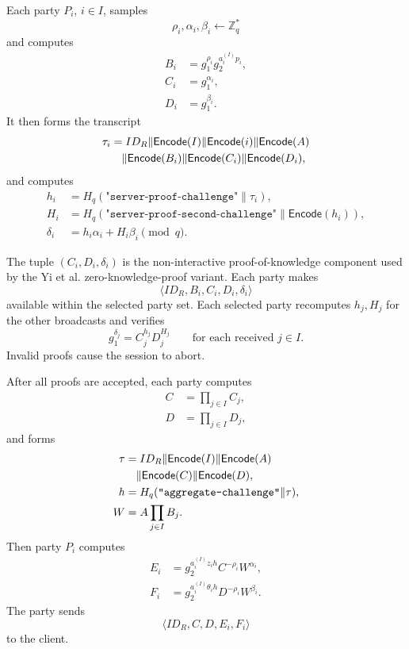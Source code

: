 \documentclass[sigconf,anonymous]{acmart}
\newcommand{\Encode}{\mathsf{Encode}}
\begin{document}
Each party \(P_i\), \(i\in I\), samples
\[
\rho_i,\alpha_i,\beta_i\leftarrow\mathbb{Z}_q^\ast
\]
and computes
\begin{align}
B_i &= g_1^{\rho_i}g_2^{a_i^{(I)}p_i},\label{eq:app-Bi}\\
C_i &= g_1^{\alpha_i},\label{eq:app-Ci}\\
D_i &= g_1^{\beta_i}.\label{eq:app-Di}
\end{align}
It then forms the transcript
\begin{align}
\tau_i &=
ID_R\|\Encode(I)\|\Encode(i)\|\Encode(A)\notag\\
&\quad\|\Encode(B_i)\|\Encode(C_i)\|\Encode(D_i),\notag
\end{align}
and computes
\begin{align}
h_i &=H_q(\texttt{"server-proof-challenge"}\|\tau_i),
\label{eq:app-hi}\\
H_i &= H_q(\texttt{"server-proof-second-challenge"}\|\Encode(h_i)),\label{eq:app-Hi}\\
\delta_i &= h_i\alpha_i+H_i\beta_i \pmod q.\label{eq:app-deltai}
\end{align}

The tuple \((C_i,D_i,\delta_i)\) is the non-interactive proof-of-knowledge component used by the Yi et al. zero-knowledge-proof variant. Each party makes
\[
\langle ID_R,B_i,C_i,D_i,\delta_i\rangle
\]
available within the selected party set. Each selected party recomputes \(h_j,H_j\) for the other broadcasts and verifies
\begin{equation}
g_1^{\delta_j}=C_j^{h_j}D_j^{H_j}
\qquad\text{for each received }j\in I.
\label{eq:app-zk-verify}
\end{equation}
Invalid proofs cause the session to abort.

After all proofs are accepted, each party computes
\begin{align}
C &= \prod_{j\in I}C_j,\label{eq:app-Cagg}\\
D &= \prod_{j\in I}D_j,\label{eq:app-Dagg}
\end{align}
and forms
\begin{align}
\tau &=ID_R\|\Encode(I)\|\Encode(A)\notag\\
&\quad\|\Encode(C)\|\Encode(D),\notag\\
h &= H_q(\texttt{"aggregate-challenge"}\|\tau),
\label{eq:app-hagg}\\
W &= A\prod_{j\in I}B_j.\label{eq:app-W}
\end{align}
Then party \(P_i\) computes
\begin{align}
E_i &= g_2^{a_i^{(I)}z_i h} C^{-\rho_i} W^{\alpha_i},\label{eq:app-Ei}\\
F_i &= g_2^{a_i^{(I)}\theta_i h} D^{-\rho_i} W^{\beta_i}.\label{eq:app-Fi}
\end{align}
The party sends
\[
\langle ID_R,C,D,E_i,F_i\rangle
\]
to the client.
\end{document}
